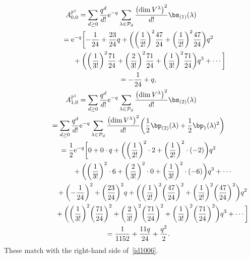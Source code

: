 \documentclass[pdftex]{sigma}
\newcommand{\bP}{\mathbb{P}}
\numberwithin{equation}{section}
\begin{document}
\begin{gather*}
A^{\bP^1}_{0,0} = \sum_{d\geq 0} \frac{q^d}{d!}{\rm e}^{-q}
\sum_{\lambda \in \mathcal{P}_d} \frac{\bigl(\dim V^\lambda\bigr)^2}{d!} \bs_{(1)}(\lambda)\\ \hphantom{A^{\bP^1}_{0,0} }{}
 = {\rm e}^{-q}\biggl[-\frac{1}{24} + \frac{23}{24}q + \biggl( \biggl(\frac{1}{2!}\biggr)^2 \frac{47}{24}
+ \biggl(\frac{1}{2!}\biggr)^2 \frac{47}{24}\biggr) q^2 \\ \hphantom{A^{\bP^1}_{0,0} = {\rm e}^{-q}\biggl[}{}
 + \biggl( \biggl(\frac{1}{3!}\biggr)^2 \frac{71}{24}
+ \biggl(\frac{2}{3!}\biggr)^2\frac{71}{24}
+ \biggl(\frac{1}{3!}\biggr)^2 \frac{71}{24}\biggr) q^3 + \cdots\biggr] \\\hphantom{A^{\bP^1}_{0,0} }{}
 = -\frac{1}{24}+q,
\\
A^{\bP^1}_{1,0} = \sum_{d\geq 0} \frac{q^d}{d!}{\rm e}^{-q}
\sum_{\lambda \in \mathcal{P}_d} \frac{\bigl(\dim V^\lambda\bigr)^2}{d!} \bs_{(2)}(\lambda)\\ \hphantom{A^{\bP^1}_{1,0}}{}
 = \sum_{d\geq 0} \frac{q^d}{d!}{\rm e}^{-q}
\sum_{\lambda \in \mathcal{P}_d} \frac{\bigl(\dim V^\lambda\bigr)^2}{d!} \biggl(\frac{1}{2}\bp_{(2)}(\lambda)
+ \frac{1}{2} \bp_1(\lambda)^2\biggr) \\ \hphantom{A^{\bP^1}_{1,0}}{}
 = \frac{1}{2} {\rm e}^{-q} \biggl[0+ 0 \cdot q + \biggl( \biggl(\frac{1}{2!}\biggr)^2 \cdot 2
+ \biggl(\frac{1}{2!}\biggr)^2 \cdot (-2) \biggr) q^2 \\ \hphantom{A^{\bP^1}_{1,0}=\frac{1}{2} {\rm e}^{-q} \biggl[}{}
 + \bigg( \biggl(\frac{1}{3!}\biggr)^2 \cdot 6
+ \biggl(\frac{2}{3!}\biggr)^2\cdot 0
+ \biggl(\frac{1}{3!}\biggr)^2 \cdot (-6) \biggr) q^3 + \cdots \\ \hphantom{A^{\bP^1}_{1,0}=\frac{1}{2} {\rm e}^{-q} \biggl[}{}
 + \biggl(-\frac{1}{24}\biggr)^2 + \biggl(\frac{23}{24}\biggr)^2q
+ \biggl( \biggl(\frac{1}{2!}\biggr)^2 \biggl(\frac{47}{24}\biggr)^2
+ \biggl(\frac{1}{2!}\biggr)^2 \biggl(\frac{47}{24}\biggr)^2 \biggr) q^2 \\ \hphantom{A^{\bP^1}_{1,0}=\frac{1}{2} {\rm e}^{-q} \biggl[}{}
 + \biggl( \biggl(\frac{1}{3!}\biggr)^2 \biggl(\frac{71}{24}\biggr)^2
+ \biggl(\frac{2}{3!}\biggr)^2 \biggl(\frac{71}{24}\biggr)^2
+ \biggl(\frac{1}{3!}\biggr)^2 \biggl(\frac{71}{24}\biggr)^2\biggr) q^3 + \cdots\biggr] \\ \hphantom{A^{\bP^1}_{1,0}}{}
 = \frac{1}{1152}+\frac{11q}{24} + \frac{q^2}{2}.
\end{gather*}
These match with the right-hand side of~\eqref{id1006}.
\end{document}
